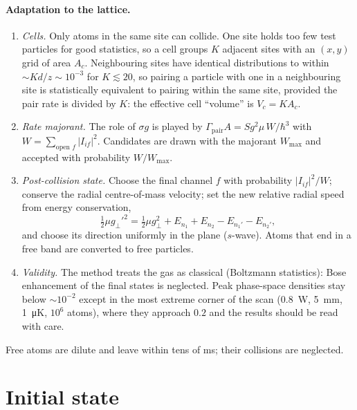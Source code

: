 \documentclass[11pt,a4paper]{article}
\begin{document}
\paragraph{Adaptation to the lattice.}
\begin{enumerate}[leftmargin=*]
\item \emph{Cells.} Only atoms in the same site can collide. One site holds too few test particles for good statistics, so a cell groups $K$ adjacent sites with an $(x,y)$ grid of area $A_c$. Neighbouring sites have identical distributions to within $\sim Kd/z\sim10^{-3}$ for $K\lesssim20$, so pairing a particle with one in a neighbouring site is statistically equivalent to pairing within the same site, provided the pair rate is divided by $K$: the effective cell ``volume'' is $V_c=KA_c$.
\item \emph{Rate majorant.} The role of $\sigma g$ is played by $\Gamma_\mathrm{pair}A=S g^2\mu\,W/\hbar^3$ with $W=\sum_{\text{open }f}|I_{if}|^2$. Candidates are drawn with the majorant $W_\mathrm{max}$ and accepted with probability $W/W_\mathrm{max}$.
\item \emph{Post-collision state.} Choose the final channel $f$ with probability $|I_{if}|^2/W$; conserve the radial centre-of-mass velocity; set the new relative radial speed from energy conservation,
\begin{equation}
\tfrac12\mu g_\perp'^2=\tfrac12\mu g_\perp^2+E_{n_1}+E_{n_2}-E_{n_1'}-E_{n_2'},
\end{equation}
and choose its direction uniformly in the plane ($s$-wave). Atoms that end in a free band are converted to free particles.
\item \emph{Validity.} The method treats the gas as classical (Boltzmann statistics): Bose enhancement of the final states is neglected. Peak phase-space densities stay below $\sim10^{-2}$ except in the most extreme corner of the scan (\SI{0.8}{W}, \SI{5}{mm}, \SI{1}{\micro K}, $10^6$ atoms), where they approach $0.2$ and the results should be read with care.
\end{enumerate}

Free atoms are dilute and leave within tens of ms; their collisions are neglected.

\section{Initial state}
\label{sec:initial}
\end{document}
